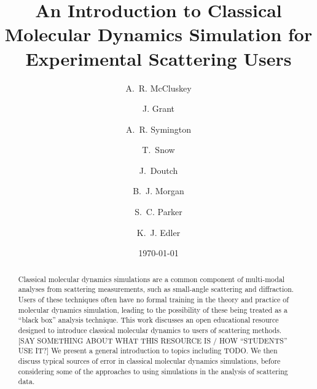 \documentclass[amsmath,amssymb,twocolumn,superscriptaddress]{revtex4-1}
\begin{document}

\title{An Introduction to Classical Molecular Dynamics Simulation for Experimental Scattering Users}

\author{A.~R. McCluskey}

\author{J. Grant}

\author{A.~R. Symington}

\author{T.~Snow}

\author{J.~Doutch}

\author{B.~J. Morgan}

\author{S.~C. Parker}

\author{K.~J. Edler}

\date{\today}

\begin{abstract}
\noindent Classical molecular dynamics simulations are a common component of multi-modal analyses from scattering measurements, such as small-angle scattering and diffraction.
Users of these techniques often have no formal training in the theory and practice of molecular dynamics simulation, leading to the possibility of these being treated as a ``black box'' analysis technique.
This work discusses an open educational resource designed to introduce classical molecular dynamics to users of scattering methods. [SAY SOMETHING ABOUT WHAT THIS RESOURCE IS / HOW ``STUDENTS'' USE IT?]
We present a general introduction to topics including TODO.
We then discuss typical sources of error in classical molecular dynamics simulations, before considering some of the approaches to using simulations in the analysis of scattering data.
\end{abstract}
\end{document}
